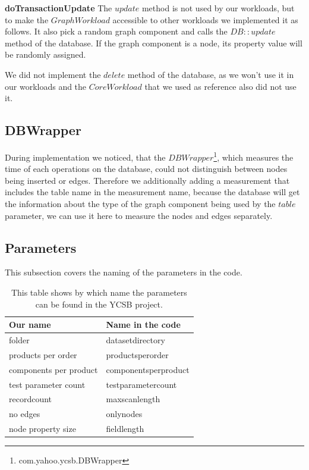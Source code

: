 \textbf{doTransactionUpdate} \newline
The $ update $ method is not used by our workloads,
but to make the $ GraphWorkload $ accessible to other workloads we implemented it as follows.
It also pick a random graph component and calls the $ DB::update $ method of the database.
If the graph component is a node,
its property value will be randomly assigned.

We did not implement the $ delete $ method of the database,
as we won't use it in our workloads and the $ CoreWorkload $ that we used as reference also did not use it.

\subsection{DBWrapper}
During implementation we noticed,
that the $ DBWrapper $\footnote{com.yahoo.ycsb.DBWrapper},
which measures the time of each operations on the database,
could not distinguish between nodes being inserted or edges.
Therefore we additionally adding a measurement that includes the table name in the measurement name,
because the database will get the information about the type of the graph component being used by the $ table $ parameter,
we can use it here to measure the nodes and edges separately.

\subsection{Parameters}
This subsection covers the naming of the parameters in the code.

\begin{table}[h!]
  \begin{minipage}{\textwidth}
    \begin{tabularx}{\textwidth}{ | X | X | }
      \hline
      Our name & Name in the code \\ \hline \hline
      folder & datasetdirectory \\ \hline
      products per order & productsperorder \\ \hline
      components per product & componentsperproduct \\ \hline
      test parameter count & testparametercount \\ \hline
      recordcount & maxscanlength \\ \hline
      no edges & onlynodes \\ \hline
      node property size & fieldlength \\ \hline
    \end{tabularx}
  \end{minipage}
  \caption{This table shows by which name the parameters can be found in the YCSB project.}
  \label{tab:parameterMapping}
\end{table}

